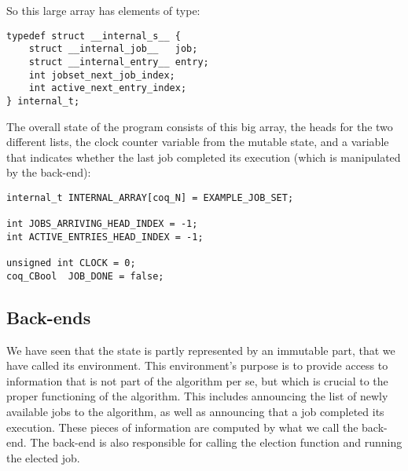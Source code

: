 	So this large array has elements of type:
	\begin{verbatim}
typedef struct __internal_s__ {
    struct __internal_job__   job;
    struct __internal_entry__ entry;
    int jobset_next_job_index;
    int active_next_entry_index;
} internal_t;
	\end{verbatim}

	The overall state of the program consists of this big array, the heads for the two different lists, the clock counter variable from the mutable state, and a variable that indicates whether the last job completed its execution (which is manipulated by the back-end):

	\begin{verbatim}
internal_t INTERNAL_ARRAY[coq_N] = EXAMPLE_JOB_SET;

int JOBS_ARRIVING_HEAD_INDEX = -1;
int ACTIVE_ENTRIES_HEAD_INDEX = -1;

unsigned int CLOCK = 0;
coq_CBool  JOB_DONE = false;
	\end{verbatim}

	\subsection{Back-ends}
	\label{sec:back-ends}

	We have seen that the state is partly represented by an immutable part, that we have called its environment. This environment's purpose is to provide access to information that is not part of the algorithm per se, but which is crucial to the proper functioning of the algorithm. This includes announcing the list of newly available jobs to the algorithm, as well as announcing that a job completed its execution. These pieces of information are computed by what we call the back-end. The back-end is also responsible for calling the election function and running the elected job.

